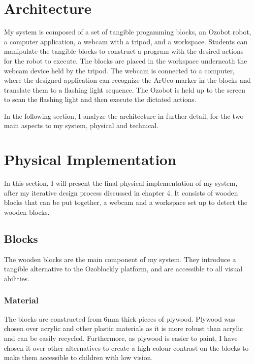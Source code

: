 \documentclass[oneside,%
                    author={Malak Hajji},
                    degree={BSc},
                    title={Designing An Accessible Computational Toolkit For Students},
                  subtitle={With Mixed Visual Abilities}]{dissertation}
\begin{document}
\section{Architecture}
My system is composed of a set of tangible progamming blocks, an Ozobot robot, a computer application, a webcam with a tripod, and a workspace. Students can manipulate the tangible blocks to construct a program with the desired actions for the robot to execute. The blocks are placed in the workspace underneath the webcam device held by the tripod. The webcam is connected to a computer, where the designed application can recognize the ArUco marker in the blocks and translate them to a flashing light sequence. The Ozobot is held up to the screen to scan the flashing light and then execute the dictated actions.

In the following section, I analyze the architecture in further detail, for the two main aspects to my system, physical and technical.
\section{Physical Implementation}
In this section, I will present the final physical implementation of my system, after my iterative design process discussed in chapter 4. It consists of wooden blocks that can be put together, a webcam and a workspace set up to detect the wooden blocks.
\subsection{Blocks}
The wooden blocks are the main component of my system. They introduce a tangible alternative to the Ozoblockly platform, and are accessible to all visual abilities.
\subsubsection{Material}
The blocks are constructed from 6mm thick pieces of plywood. Plywood was chosen over acrylic and other plastic materials as it is more robust than acrylic and can be easily recycled. Furthermore, as plywood is easier to paint, I have chosen it over other alternatives to create a high colour contrast on the blocks to make them accessible to children with low vision.
\end{document}
